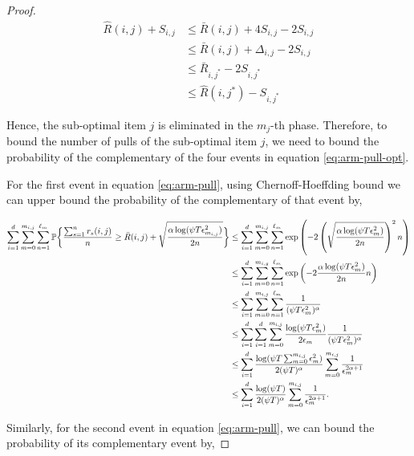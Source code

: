 \begin{proof}
\begin{align*}
\hat{R}(i,j) + S_{i,j} &\leq \bar{R}(i,j) + 4S_{i,j} - 2S_{i,j} \\
&\leq \bar{R}(i,j) + \Delta_{i,j} - 2S_{i,j}\\
& \leq \bar{R}_{i,j^*} - 2S_{i,j^*} \\
&\leq \hat{R}(i,j^*) - S_{i , j^*}
\end{align*}

Hence, the sub-optimal item $j$ is eliminated in the $m_{j}$-th phase. Therefore, to bound the number of pulls of the sub-optimal item $j$, we need to bound the probability of the complementary of the four events in equation \ref{eq:arm-pull-opt}.

For the first event in equation \ref{eq:arm-pull}, using Chernoff-Hoeffding bound we can upper bound the probability of the complementary of that event by,

\begin{align*}
\sum_{i=1}^{d}\sum_{m=0}^{m_{i,j}}\sum_{n=1}^{\ell_{m_{}}}\mathbb{P}\bigg\lbrace \dfrac{\sum_{s=1}^{n} r_{s}(i,j)}{n} \geq  \bar{R}(i,j) + \sqrt{\dfrac{\alpha\log(\psi T\epsilon_{m_{i,j}}^2)}{2n}} \bigg\rbrace & \leq \sum_{i=1}^{d}\sum_{m=0}^{m_{i,j}}\sum_{n=1}^{\ell_{m_{}}}\exp\left(-2 \left(\sqrt{\dfrac{\alpha\log(\psi T\epsilon_{m_{}}^2)}{2n}}\right)^2 n \right)\\
&\leq \sum_{i=1}^{d}\sum_{m=0}^{m_{i,g}}\sum_{n=1}^{\ell_{m_{}}}\exp\left(-2\dfrac{\alpha\log(\psi T\epsilon_{m_{}}^2)}{2n}n \right)\\
&\leq \sum_{i=1}^{d}\sum_{m=0}^{m_{i,j}}\sum_{n=1}^{\ell_{m_{}}}\dfrac{1}{(\psi T\epsilon_{m_{}}^2)^{\alpha}} \\
&\leq \sum_{i=1}^{d}\sum_{i=1}^{d}\sum_{m=0}^{m_{i,j}}\dfrac{\log(\psi T\epsilon_{m_{}}^2)}{2\epsilon_{m_{}}}\dfrac{1}{(\psi T\epsilon_{m_{}}^2)^{\alpha}} \\
&\leq \sum_{i=1}^{d} \dfrac{\log(\psi T  \sum_{m=0}^{m_{i,j}}\epsilon_{m}^2)}{2(\psi T)^{\alpha}}\sum_{m=0}^{m_{i,j}}\dfrac{1}{\epsilon_{m_{}}^{2\alpha +1}} \\
&\leq \sum_{i=1}^{d}\dfrac{\log(\psi T)}{2(\psi T)^{\alpha}}\sum_{m=0}^{m_{i,j}}\dfrac{1}{\epsilon_{m_{}}^{2\alpha +1}}.
\end{align*}

Similarly, for the second event in equation \ref{eq:arm-pull}, we can bound the probability of its complementary event by,


\end{proof}
